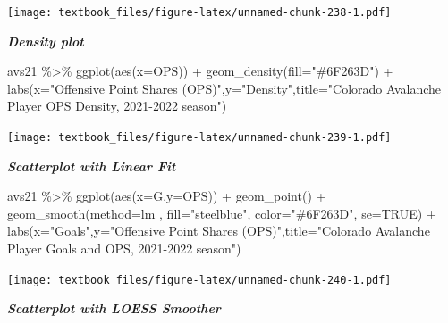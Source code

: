 \documentclass[
  11pt,
]{book}
\newenvironment{Shaded}{\begin{snugshade}}{\end{snugshade}}
\newcommand{\AttributeTok}[1]{\textcolor[rgb]{0.77,0.63,0.00}{#1}}
\newcommand{\ConstantTok}[1]{\textcolor[rgb]{0.00,0.00,0.00}{#1}}
\newcommand{\FunctionTok}[1]{\textcolor[rgb]{0.00,0.00,0.00}{#1}}
\newcommand{\NormalTok}[1]{#1}
\newcommand{\SpecialCharTok}[1]{\textcolor[rgb]{0.00,0.00,0.00}{#1}}
\newcommand{\StringTok}[1]{\textcolor[rgb]{0.31,0.60,0.02}{#1}}
\theoremstyle{definition}
\theoremstyle{definition}
\theoremstyle{definition}
\theoremstyle{definition}
\theoremstyle{remark}
\begin{document}
\texttt{[image: textbook\_files/figure-latex/unnamed-chunk-238-1.pdf]}

\newpage

\textbf{\emph{Density plot}}

\begin{Shaded}
\begin{Highlighting}[]
\NormalTok{avs21 }\SpecialCharTok{\%\textgreater{}\%} \FunctionTok{ggplot}\NormalTok{(}\FunctionTok{aes}\NormalTok{(}\AttributeTok{x=}\NormalTok{OPS)) }\SpecialCharTok{+} \FunctionTok{geom\_density}\NormalTok{(}\AttributeTok{fill=}\StringTok{"\#6F263D"}\NormalTok{) }\SpecialCharTok{+} 
  \FunctionTok{labs}\NormalTok{(}\AttributeTok{x=}\StringTok{"Offensive Point Shares (OPS)"}\NormalTok{,}\AttributeTok{y=}\StringTok{"Density"}\NormalTok{,}\AttributeTok{title=}\StringTok{"Colorado Avalanche Player OPS Density, 2021{-}2022 season"}\NormalTok{)}
\end{Highlighting}
\end{Shaded}

\texttt{[image: textbook\_files/figure-latex/unnamed-chunk-239-1.pdf]}

\newpage

\textbf{\emph{Scatterplot with Linear Fit}}

\begin{Shaded}
\begin{Highlighting}[]
\NormalTok{avs21 }\SpecialCharTok{\%\textgreater{}\%} \FunctionTok{ggplot}\NormalTok{(}\FunctionTok{aes}\NormalTok{(}\AttributeTok{x=}\NormalTok{G,}\AttributeTok{y=}\NormalTok{OPS)) }\SpecialCharTok{+} \FunctionTok{geom\_point}\NormalTok{() }\SpecialCharTok{+}
  \FunctionTok{geom\_smooth}\NormalTok{(}\AttributeTok{method=}\NormalTok{lm , }\AttributeTok{fill=}\StringTok{"steelblue"}\NormalTok{, }\AttributeTok{color=}\StringTok{"\#6F263D"}\NormalTok{, }\AttributeTok{se=}\ConstantTok{TRUE}\NormalTok{) }\SpecialCharTok{+}
  \FunctionTok{labs}\NormalTok{(}\AttributeTok{x=}\StringTok{"Goals"}\NormalTok{,}\AttributeTok{y=}\StringTok{"Offensive Point Shares (OPS)"}\NormalTok{,}\AttributeTok{title=}\StringTok{"Colorado Avalanche Player Goals and OPS, 2021{-}2022 season"}\NormalTok{)}
\end{Highlighting}
\end{Shaded}

\texttt{[image: textbook\_files/figure-latex/unnamed-chunk-240-1.pdf]}

\newpage

\textbf{\emph{Scatterplot with LOESS Smoother}}
\end{document}
